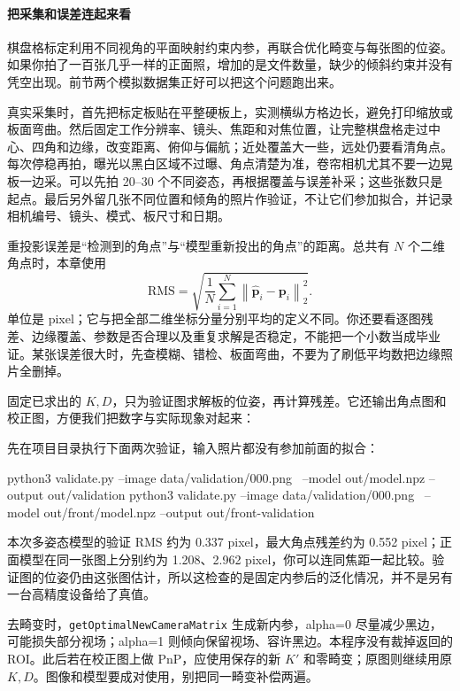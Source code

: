 \paragraph*{把采集和误差连起来看}
棋盘格标定利用不同视角的平面映射约束内参，再联合优化畸变与每张图的位姿。如果你拍了一百张几乎一样的正面照，增加的是文件数量，缺少的倾斜约束并没有凭空出现。前节两个模拟数据集正好可以把这个问题跑出来。

真实采集时，首先把标定板贴在平整硬板上，实测横纵方格边长，避免打印缩放或板面弯曲。然后固定工作分辨率、镜头、焦距和对焦位置，让完整棋盘格走过中心、四角和边缘，改变距离、俯仰与偏航；近处覆盖大一些，远处仍要看清角点。每次停稳再拍，曝光以黑白区域不过曝、角点清楚为准，卷帘相机尤其不要一边晃板一边采。可以先拍 20--30 个不同姿态，再根据覆盖与误差补采；这些张数只是起点。最后另外留几张不同位置和倾角的照片作验证，不让它们参加拟合，并记录相机编号、镜头、模式、板尺寸和日期。

重投影误差是“检测到的角点”与“模型重新投出的角点”的距离。总共有 $N$ 个二维角点时，本章使用
\[
\mathrm{RMS}=\sqrt{\frac1N\sum_{i=1}^{N}
 \left\|\hat{\boldsymbol p}_i-\boldsymbol p_i\right\|_2^2}.
\]
单位是 pixel；它与把全部二维坐标分量分别平均的定义不同。你还要看逐图残差、边缘覆盖、参数是否合理以及重复求解是否稳定，不能把一个小数当成毕业证。某张误差很大时，先查模糊、错检、板面弯曲，不要为了刷低平均数把边缘照片全删掉。

\begin{example}[留一张照片检查模型]
 固定已求出的 $K,D$，只为验证图求解板的位姿，再计算残差。它还输出角点图和校正图，方便我们把数字与实际现象对起来：

先在项目目录执行下面两次验证，输入照片都没有参加前面的拟合：
\begin{tbash}
python3 validate.py --image data/validation/000.png \
  --model out/model.npz --output out/validation
python3 validate.py --image data/validation/000.png \
  --model out/front/model.npz --output out/front-validation
\end{tbash}
本次多姿态模型的验证 RMS 约为 0.337 pixel，最大角点残差约为 0.552 pixel；正面模型在同一张图上分别约为 1.208、2.962 pixel，你可以连同焦距一起比较。验证图的位姿仍由这张图估计，所以这检查的是固定内参后的泛化情况，并不是另有一台高精度设备给了真值。

去畸变时，\texttt{getOptimalNewCameraMatrix} 生成新内参，alpha=0 尽量减少黑边，可能损失部分视场；alpha=1 则倾向保留视场、容许黑边。本程序没有裁掉返回的 ROI。此后若在校正图上做 PnP，应使用保存的新 $K'$ 和零畸变；原图则继续用原 $K,D$。图像和模型要成对使用，别把同一畸变补偿两遍。
\end{example}

